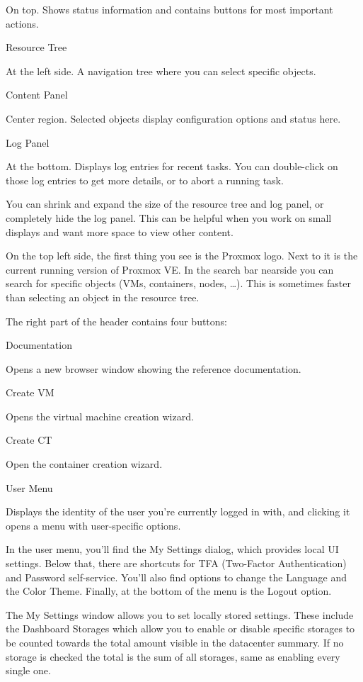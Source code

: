 On top. Shows status information and contains buttons for most important actions.

Resource Tree

At the left side. A navigation tree where you can select specific objects.

Content Panel

Center region. Selected objects display configuration options and status here.

Log Panel

At the bottom. Displays log entries for recent tasks. You can double-click on those log entries to get more details, or to abort a running task.

You can shrink and expand the size of the resource tree and log panel, or completely hide the log panel. This can be helpful when you work on small displays and want more space to view other content.

On the top left side, the first thing you see is the Proxmox logo. Next to it is the current running version of Proxmox VE. In the search bar nearside you can search for specific objects (VMs, containers, nodes, …). This is sometimes faster than selecting an object in the resource tree.

The right part of the header contains four buttons:

Documentation

Opens a new browser window showing the reference documentation.

Create VM

Opens the virtual machine creation wizard.

Create CT

Open the container creation wizard.

User Menu

Displays the identity of the user you’re currently logged in with, and clicking it opens a menu with user-specific options.

In the user menu, you’ll find the My Settings dialog, which provides local UI settings. Below that, there are shortcuts for TFA (Two-Factor Authentication) and Password self-service. You’ll also find options to change the Language and the Color Theme. Finally, at the bottom of the menu is the Logout option.

The My Settings window allows you to set locally stored settings. These include the Dashboard Storages which allow you to enable or disable specific storages to be counted towards the total amount visible in the datacenter summary. If no storage is checked the total is the sum of all storages, same as enabling every single one.

